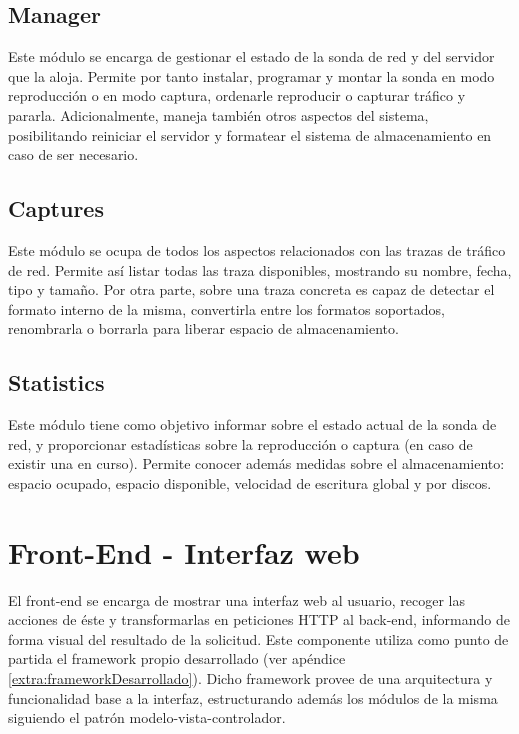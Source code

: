 \subsection{Manager\label{ssec:dis:manager}}

Este módulo se encarga de gestionar el estado de la sonda de red y del servidor que la aloja.
Permite por tanto instalar, programar y montar la sonda en modo reproducción o en modo captura, ordenarle reproducir o capturar tráfico y pararla. Adicionalmente, maneja también otros aspectos del sistema, posibilitando reiniciar el servidor y formatear el sistema de almacenamiento en caso de ser necesario.


\subsection{Captures\label{ssec:dis:captures}}

Este módulo se ocupa de todos los aspectos relacionados con las \glspl{traza} de tráfico de red.
Permite así listar todas las \gls{traza} disponibles, mostrando su nombre, fecha, tipo y tamaño.
Por otra parte, sobre una \gls{traza} concreta es capaz de detectar el formato interno de la misma, convertirla entre los formatos soportados, renombrarla o borrarla para liberar espacio de almacenamiento.


\subsection{Statistics\label{ssec:dis:statistics}}

Este módulo tiene como objetivo informar sobre el estado actual de la sonda de red, y proporcionar estadísticas sobre la reproducción o captura (en caso de existir una en curso).
Permite conocer además medidas sobre el almacenamiento: espacio ocupado, espacio disponible, velocidad de escritura global y por discos.


\section{Front-End - Interfaz web\label{sec:dis:interfaz_web}}

El \gls{front-end} se encarga de mostrar una interfaz web al usuario, recoger las acciones de éste y transformarlas en peticiones \gls{HTTP} al \gls{back-end}, informando de forma visual del resultado de la solicitud.
Este componente utiliza como punto de partida el \gls{framework} propio desarrollado (ver apéndice \ref{extra:frameworkDesarrollado}).
Dicho \gls{framework} provee de una arquitectura y funcionalidad base a la interfaz, estructurando además los módulos de la misma siguiendo el patrón modelo-vista-controlador.

